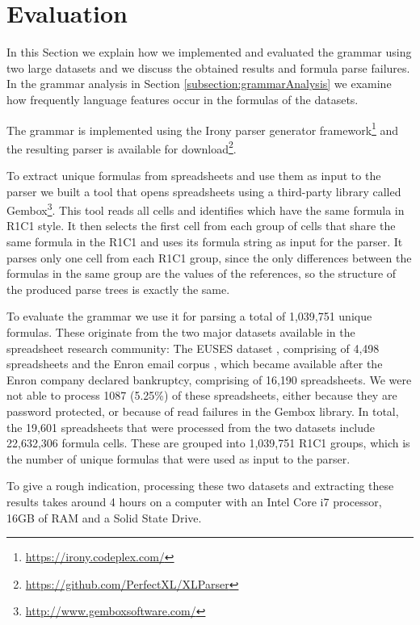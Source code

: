 \documentclass[conference]{IEEEtran}
\begin{document}
\section{Evaluation}
\label{sec:evaluation}

In this Section we explain how we implemented and evaluated the grammar using two large datasets and we discuss the obtained results and formula parse failures. In the grammar analysis in Section \ref{subsection:grammarAnalysis} we examine how frequently language features occur in the formulas of the datasets.

The grammar is implemented using the Irony parser generator framework\footnote{\url{https://irony.codeplex.com/}} and the resulting parser is available for download\footnote{\url{https://github.com/PerfectXL/XLParser}}.

To extract unique formulas from spreadsheets and use them as input to the parser we built a tool that opens spreadsheets using a third-party library called Gembox\footnote{\url{http://www.gemboxsoftware.com/}}. This tool reads all cells and identifies which have the same formula in R1C1 style. It then selects the first cell from each group of cells that share the same formula in the R1C1 and uses its formula string as input for the parser. It parses only one cell from each R1C1 group, since the only differences between the formulas in the same group are the values of the references, so the structure of the produced parse trees is exactly the same.

To evaluate the grammar we use it for parsing a total of 1,039,751 unique formulas. These originate from the two major datasets available in the spreadsheet research community: The EUSES dataset \cite{euses}, comprising of 4,498 spreadsheets and the Enron email corpus \cite{enron}, which became available after the Enron company declared bankruptcy, comprising of 16,190 spreadsheets. We were not able to process 1087 (5.25\%) of these spreadsheets, either because they are password protected, or because of read failures in the Gembox library. In total, the 19,601 spreadsheets that were processed from the two datasets include 22,632,306 formula cells. These are grouped into 1,039,751 R1C1 groups, which is the number of unique formulas that were used as input to the parser.

To give a rough indication, processing these two datasets and extracting these results takes around 4 hours on a computer with an Intel Core i7 processor, 16GB of RAM and a Solid State Drive.
\end{document}

